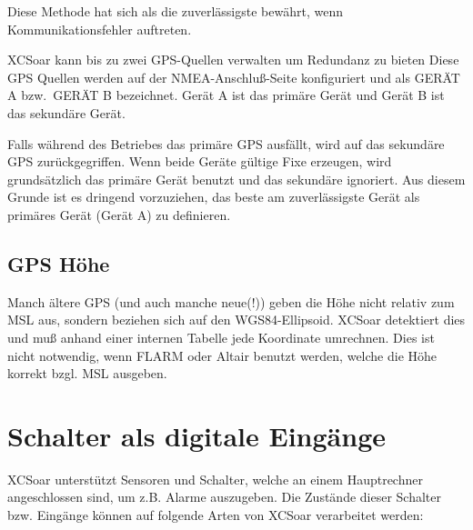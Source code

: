 Diese Methode hat sich als die zuverlässigste bewährt, wenn Kommunikationsfehler auftreten.

\textsf{XCSoar} kann bis zu zwei GPS-Quellen verwalten um Redundanz zu bieten
Diese GPS Quellen werden auf der NMEA-Anschluß-Seite konfiguriert und als GERÄT A bzw.\ GERÄT B
bezeichnet.  Gerät  A ist das primäre Gerät und Gerät B ist das sekundäre Gerät.


Falls während des Betriebes das primäre GPS ausfällt, wird auf das sekundäre GPS zurückgegriffen. Wenn beide Geräte gültige Fixe erzeugen, wird grundsätzlich das primäre Gerät benutzt und das sekundäre ignoriert.  Aus diesem Grunde ist es dringend vorzuziehen, das beste am zuverlässigste Gerät als primäres Gerät (Gerät A) zu definieren.

\subsection*{GPS Höhe}

Manch ältere GPS  (und auch manche neue(!)) geben die Höhe nicht relativ zum MSL aus, sondern beziehen sich auf den WGS84-Ellipsoid.  \textsf{XCSoar} detektiert dies und muß anhand einer internen Tabelle jede Koordinate umrechnen.
Dies ist nicht notwendig, wenn FLARM oder \textsf{Altair} benutzt werden, welche die Höhe korrekt bzgl. MSL ausgeben.
\section{Schalter als digitale Eingänge}

\textsf{XCSoar} unterstützt Sensoren und Schalter, welche an einem Hauptrechner angeschlossen sind, um z.B. Alarme auszugeben. Die Zustände dieser Schalter bzw. Eingänge können auf folgende Arten von \textsf{XCSoar} verarbeitet werden:

